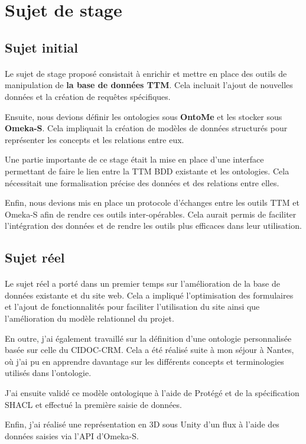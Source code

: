 \section{Sujet de stage}
\subsection{Sujet initial}
\paragraph{} \hspace{10mm}
Le sujet de stage proposé consistait à enrichir et mettre en place des outils de manipulation de \textbf{la base de données TTM}. Cela incluait l'ajout de nouvelles données et la création de requêtes spécifiques.

Ensuite, nous devions définir les ontologies sous \textbf{OntoMe} et les stocker sous \textbf{Omeka-S}. Cela impliquait la création de modèles de données structurés pour représenter les concepts et les relations entre eux.

Une partie importante de ce stage était la mise en place d'une interface permettant de faire le lien entre la TTM BDD existante et les ontologies. Cela nécessitait une formalisation précise des données et des relations entre elles.

Enfin, nous devions mis en place un protocole d'échanges entre les outils TTM et Omeka-S afin de rendre ces outils inter-opérables. Cela aurait permis de faciliter l'intégration des données et de rendre les outils plus efficaces dans leur utilisation.
\subsection{Sujet réel}
\paragraph{} \hspace{10mm}
Le sujet réel a porté dans un premier temps sur l'amélioration de la base de données existante et du site web. Cela a impliqué l'optimisation des formulaires et l'ajout de fonctionnalités pour faciliter l'utilisation du site ainsi que l'amélioration du modèle relationnel du projet.

En outre, j'ai également travaillé sur la définition d'une ontologie personnalisée basée sur celle du CIDOC-CRM. Cela a été réalisé suite à mon séjour à Nantes, où j'ai pu en apprendre davantage sur les différents concepts et terminologies utilisés dans l'ontologie.

J'ai ensuite validé ce modèle ontologique à l'aide de Protégé et de la spécification SHACL et effectué la première saisie de données.

Enfin, j'ai réalisé une représentation en 3D sous Unity d'un flux à l'aide des données saisies via l'API d'Omeka-S.